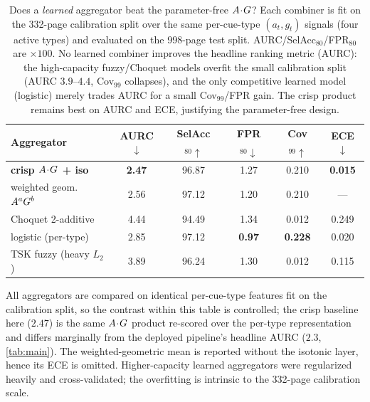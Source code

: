 \begin{table}[!h]
\caption{Does a \emph{learned} aggregator beat the parameter-free $A\!\cdot\!G$?
Each combiner is fit on the 332-page calibration split over the same per-cue-type
$(a_t,g_t)$ signals (four active types) and evaluated on the 998-page test split.
AURC/SelAcc$_{80}$/FPR$_{80}$ are $\times100$. No learned combiner improves the headline
ranking metric (AURC): the high-capacity fuzzy/Choquet models overfit the small
calibration split (AURC $3.9$--$4.4$, Cov$_{99}$ collapses), and the only competitive
learned model (logistic) merely trades AURC for a small Cov$_{99}$/FPR gain. The crisp
product remains best on AURC and ECE, justifying the parameter-free design.}
\label{tab:hfgea}
\footnotesize
\setlength{\tabcolsep}{3.0pt}
\begin{tabular*}{\columnwidth}{@{\extracolsep{\fill}}lccccc@{}}
\toprule
Aggregator & AURC$\downarrow$ & SelAcc$_{80}\uparrow$ & FPR$_{80}\downarrow$ & Cov$_{99}\uparrow$ & ECE$\downarrow$ \\
\midrule
\textbf{crisp $A\!\cdot\!G$ + iso} & \textbf{2.47} & 96.87 & 1.27 & 0.210 & \textbf{0.015} \\
weighted geom. $A^aG^b$            & 2.56 & 97.12 & 1.20 & 0.210 & --- \\
Choquet 2-additive                       & 4.44 & 94.49 & 1.34 & 0.012 & 0.249 \\
logistic (per-type)                      & 2.85 & 97.12 & \textbf{0.97} & \textbf{0.228} & 0.020 \\
TSK fuzzy (heavy $L_2$)                  & 3.89 & 96.24 & 1.30 & 0.012 & 0.115 \\
\bottomrule
\end{tabular*}

\footnotesize{All aggregators are compared on identical per-cue-type features fit on the
calibration split, so the contrast within this table is controlled; the crisp baseline here
($2.47$) is the same $A\!\cdot\!G$ product re-scored over the per-type representation and
differs marginally from the deployed pipeline's headline AURC ($2.3$, \autoref{tab:main}). The
weighted-geometric mean is reported without the isotonic layer, hence its ECE is omitted.
Higher-capacity learned aggregators were regularized heavily and cross-validated; the
overfitting is intrinsic to the 332-page calibration scale.}
\end{table}
